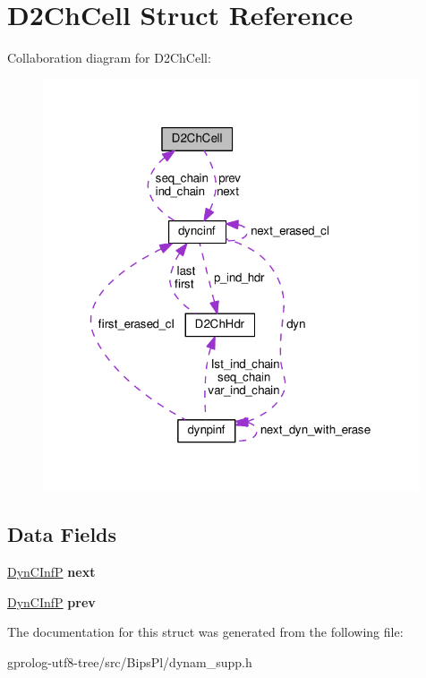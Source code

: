 \hypertarget{structD2ChCell}{}\section{D2\+Ch\+Cell Struct Reference}
\label{structD2ChCell}


Collaboration diagram for D2\+Ch\+Cell\+:\nopagebreak
\begin{figure}[H]
\begin{center}
\leavevmode
\includegraphics[width=315pt]{structD2ChCell__coll__graph}
\end{center}
\end{figure}
\subsection*{Data Fields}
\begin{DoxyCompactItemize}
\item 
\hyperlink{structdyncinf}{Dyn\+C\+InfP} {\bfseries next}\hypertarget{structD2ChCell_ab3eac88c8e41656c4dfa195b314fef5c}{}\label{structD2ChCell_ab3eac88c8e41656c4dfa195b314fef5c}

\item 
\hyperlink{structdyncinf}{Dyn\+C\+InfP} {\bfseries prev}\hypertarget{structD2ChCell_a93c613b80554c6b885b8c680658475cf}{}\label{structD2ChCell_a93c613b80554c6b885b8c680658475cf}

\end{DoxyCompactItemize}


The documentation for this struct was generated from the following file\+:\begin{DoxyCompactItemize}
\item 
gprolog-\/utf8-\/tree/src/\+Bips\+Pl/dynam\+\_\+supp.\+h\end{DoxyCompactItemize}
